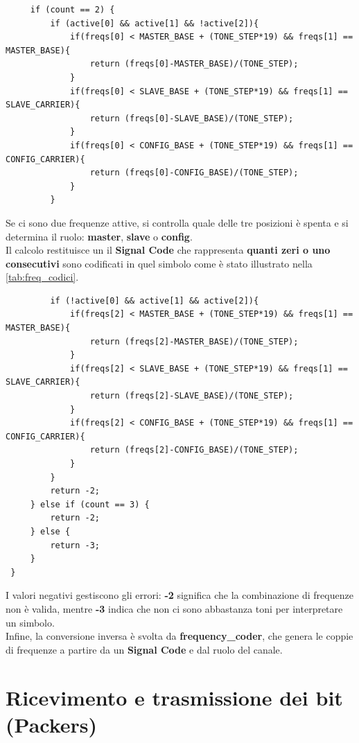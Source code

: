  \begin{verbatim}
     if (count == 2) {
         if (active[0] && active[1] && !active[2]){
             if(freqs[0] < MASTER_BASE + (TONE_STEP*19) && freqs[1] == MASTER_BASE){
                 return (freqs[0]-MASTER_BASE)/(TONE_STEP);
             }
             if(freqs[0] < SLAVE_BASE + (TONE_STEP*19) && freqs[1] == SLAVE_CARRIER){
                 return (freqs[0]-SLAVE_BASE)/(TONE_STEP);
             }
             if(freqs[0] < CONFIG_BASE + (TONE_STEP*19) && freqs[1] == CONFIG_CARRIER){
                 return (freqs[0]-CONFIG_BASE)/(TONE_STEP);
             }
         }
 \end{verbatim}
 
 Se ci sono due frequenze attive, si controlla quale delle tre posizioni è spenta e si determina il ruolo: \textbf{master}, \textbf{slave} o \textbf{config}. \\
 Il calcolo restituisce un il \textbf{Signal Code} che rappresenta \textbf{quanti zeri o uno consecutivi} sono codificati in quel simbolo come è stato illustrato 
 nella \autoref{tab:freq_codici}.
 
 \begin{verbatim}
         if (!active[0] && active[1] && active[2]){
             if(freqs[2] < MASTER_BASE + (TONE_STEP*19) && freqs[1] == MASTER_BASE){
                 return (freqs[2]-MASTER_BASE)/(TONE_STEP);
             }
             if(freqs[2] < SLAVE_BASE + (TONE_STEP*19) && freqs[1] == SLAVE_CARRIER){
                 return (freqs[2]-SLAVE_BASE)/(TONE_STEP);
             }
             if(freqs[2] < CONFIG_BASE + (TONE_STEP*19) && freqs[1] == CONFIG_CARRIER){
                 return (freqs[2]-CONFIG_BASE)/(TONE_STEP);
             }
         }
         return -2;
     } else if (count == 3) {
         return -2;
     } else {
         return -3;
     }
 }
 \end{verbatim}
 
 I valori negativi gestiscono gli errori: \textbf{-2} significa che la combinazione di frequenze non è valida, mentre \textbf{-3} indica 
 che non ci sono abbastanza toni per interpretare un simbolo.\\  
 
 Infine, la conversione inversa è svolta da \textbf{frequency\_coder}, che genera le coppie di frequenze a partire da un
  \textbf{Signal Code} e dal ruolo del canale. 
 

\section{Ricevimento e trasmissione dei bit (Packers)}
